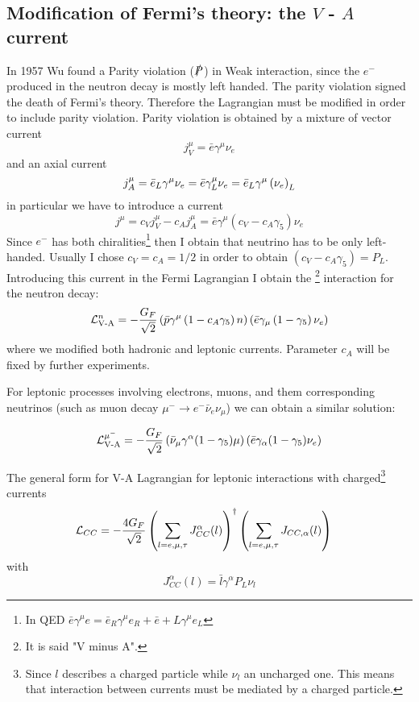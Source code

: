 \documentclass[TheoreticalPhy_ModB.tex]{subfiles}
\begin{document}
\subsection{Modification of Fermi's theory: the $V$ - $A$ current}
In 1957 Wu found a Parity violation ($\slashed P$) in Weak interaction, since the $e^-$ produced in the neutron decay is mostly left handed. The parity violation signed the death of Fermi's theory. Therefore the Lagrangian must be modified in order to include parity violation. Parity violation is obtained by a mixture of vector current
\[j_V^\mu=\bar e\gamma^\mu \nu_e\]
and an axial current
\[j^\mu_A=\bar e_L\gamma^\mu\nu_e=\bar e\gamma^\mu_L\nu_e=\bar e_L\gamma^\mu\left(\nu_e\right)_L\]
in particular we have to introduce a current
\[j^\mu=c_Vj^\mu_V-c_Aj^\mu_A=\bar e\gamma^\mu(c_V-c_A\gamma_5)\nu_e\]
Since $e^-$ has both chiralities\footnote{In QED $\bar e\gamma^\mu e=\bar e_R\gamma^\mu e_R+\bar e+L\gamma^\mu e_L$} then I obtain that neutrino has to be only left-handed. Usually I chose $c_V=c_A=1/2$ in order to obtain $(c_V-c_A\gamma_5)=P_L$. Introducing this current in the Fermi Lagrangian I obtain the \footnote{It is said "V minus A".} interaction for the neutron decay:
\[\mathcal L_{\text{V-A}}^n=-\frac {G_F}{\sqrt2} \left(\bar p\gamma^\mu\left(1-c_A\gamma_5\right) n\right)\left(\bar e \gamma_\mu\left(1-\gamma_5\right)\nu_e\right)\]
where we modified both hadronic and leptonic currents. Parameter $c_A$ will be fixed by further experiments.

For leptonic processes involving electrons, muons, and them corresponding neutrinos (such as muon decay $\mu^-\to e^-\bar\nu_e\nu_\mu$) we can obtain a similar solution:

\[\mathcal L_{\text{V-A}}^{\mu^-}=-\frac {G_F}{\sqrt2} \left(\bar \nu_\mu\gamma^\alpha (1-\gamma_5)\mu\right)\left(\bar e \gamma_\alpha (1-\gamma_5)\nu_e\right)\]

The general form for V-A Lagrangian for leptonic interactions with charged\footnote{Since $l$ describes a charged particle while $\nu_l$ an uncharged one. This means that interaction between currents must be mediated by a charged particle.} currents
\begin{align*}
\mathcal L_{CC}
&=-\frac{4G_F}{\sqrt2}\left(\sum_{l=e,\mu,\tau}J_{CC}^{\alpha}(l)\right)^\dagger\left(\sum_{l=e,\mu,\tau}J_{CC,\alpha}(l)\right)
\end{align*}
with
\begin{equation}\label{eqn:charged-current-VA}
J_{CC}^{\alpha}(l)=\bar l\gamma^\alpha P_L\nu_l
\end{equation}
\end{document}
